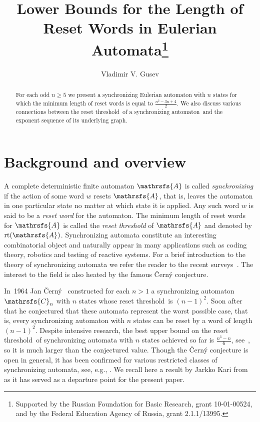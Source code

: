 \documentclass[11pt]{llncs}
\newcommand{\san}{synchronizing automaton}
\newcommand{\reth}{reset threshold}
\DeclareMathOperator{\rt}{rt}
\begin{document}
\title{Lower Bounds for the Length of Reset Words in Eulerian Automata\thanks{Supported
by the Russian Foundation for Basic Research, grant 10-01-00524, and by the
Federal Education Agency of Russia, grant 2.1.1/13995.}}
\author{Vladimir V. Gusev}

\maketitle

\begin{abstract}
For each odd $n\ge 5$ we present a synchronizing Eulerian automaton with $n$
states for which the minimum length of reset words is equal to $\frac{n^2 - 3n
+ 4}{2}$. We also discuss various connections between the \reth\ of a \san\ and
the exponent sequence of its underlying graph.
\end{abstract}


\section{Background and overview}
\label{intro}


A complete deterministic finite automaton $\mathrsfs{A}$ is called
\emph{synchronizing} if the action of some word $w$ resets $\mathrsfs{A}$, that
is, leaves the automaton in one particular state no matter at which state it is
applied. Any such word $w$ is said to be a \emph{reset word} for the automaton.
The minimum length of reset words for $\mathrsfs{A}$ is called the \emph{\reth}
of $\mathrsfs{A}$ and denoted by $\rt(\mathrsfs{A})$. Synchronizing automata
constitute an interesting combinatorial object and naturally appear in many
applications such as coding theory, robotics and testing of reactive systems.
For a brief introduction to the theory of synchronizing automata we refer the
reader to the recent surveys~\cite{Sa05,Vo08}. The interest to the field is
also heated by the famous \v{C}ern\'{y} conjecture.

In~1964 Jan \v{C}ern\'{y}~\cite{Ce64} constructed for each $n>1$ a
synchronizing automaton $\mathrsfs{C}_n$ with $n$ states whose \reth\ is
$(n-1)^2$. Soon after that he conjectured that these automata represent the
worst possible case, that is, every synchronizing automaton with $n$ states can
be reset by a word of length $(n-1)^2$. Despite intensive research, the best
upper bound on the \reth\ of synchronizing automata with $n$ states achieved so
far is $\frac{n^3-n}6$, see~\cite{Pi83}, so it is much larger than the
conjectured value. Though the \v{C}ern\'{y} conjecture is open in general, it
has been confirmed for various restricted classes of synchronizing automata,
see, e.g., \cite{Ep90,Du98,Ka03,Tr07,Vo09}. We recall here a result by Jarkko
Kari from~\cite{Ka03} as it has served as a departure point for the present
paper.
\end{document}
